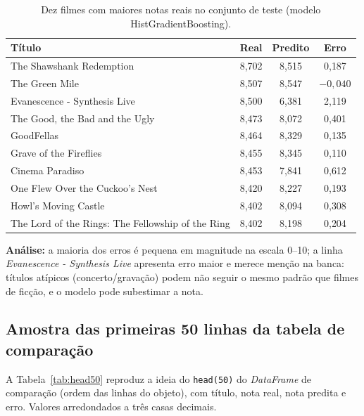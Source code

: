 \documentclass[11pt,a4paper]{article}
\begin{document}
\begin{table}[H]
  \centering
  \caption{Dez filmes com maiores notas reais no conjunto de teste (modelo HistGradientBoosting).}
  \label{tab:top10}
  \small
  \begin{tabular}{p{6.2cm}ccc}
    \toprule
    \textbf{Título} & \textbf{Real} & \textbf{Predito} & \textbf{Erro} \\
    \midrule
    The Shawshank Redemption & 8{,}702 & 8{,}515 & 0{,}187 \\
    The Green Mile & 8{,}507 & 8{,}547 & $-0{,}040$ \\
    Evanescence - Synthesis Live & 8{,}500 & 6{,}381 & 2{,}119 \\
    The Good, the Bad and the Ugly & 8{,}473 & 8{,}072 & 0{,}401 \\
    GoodFellas & 8{,}464 & 8{,}329 & 0{,}135 \\
    Grave of the Fireflies & 8{,}455 & 8{,}345 & 0{,}110 \\
    Cinema Paradiso & 8{,}453 & 7{,}841 & 0{,}612 \\
    One Flew Over the Cuckoo's Nest & 8{,}420 & 8{,}227 & 0{,}193 \\
    Howl's Moving Castle & 8{,}402 & 8{,}094 & 0{,}308 \\
    The Lord of the Rings: The Fellowship of the Ring & 8{,}402 & 8{,}198 & 0{,}204 \\
    \bottomrule
  \end{tabular}
\end{table}

\textbf{Análise:} a maioria dos erros é pequena em magnitude na escala 0--10; a linha \emph{Evanescence - Synthesis Live} apresenta erro maior e merece menção na banca: títulos atípicos (concerto/gravação) podem não seguir o mesmo padrão que filmes de ficção, e o modelo pode subestimar a nota.

\subsection{Amostra das primeiras 50 linhas da tabela de comparação}
A Tabela~\ref{tab:head50} reproduz a ideia do \texttt{head(50)} do \emph{DataFrame} de comparação (ordem das linhas do objeto), com título, nota real, nota predita e erro. Valores arredondados a três casas decimais.
\end{document}
